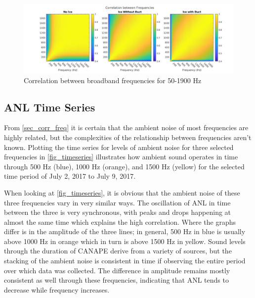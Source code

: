 
\begin{figure}[ht]
\centering
\includegraphics[scale=0.35]{Figures/corr_all_1x3.jpg}
\caption{Correlation between broadband frequencies for 50-1900 Hz}
\label{fig_freq_corr}
\end{figure}

\subsection{ANL Time Series}\label{sec_timeseries}

From \autoref{sec_corr_freq} it is certain that the ambient noise of most frequencies are highly related, but the complexities of the relationship between frequencies aren't known. Plotting the time series for levels of ambient noise for three selected frequencies in \autoref{fig_timeseries} illustrates how ambient sound operates in time through 500 Hz (blue), 1000 Hz (orange), and 1500 Hz (yellow) for the selected time period of July 2, 2017 to July 9, 2017. %

When looking at \autoref{fig_timeseries}, it is obvious that the ambient noise of these three frequencies vary in very similar ways. The oscillation of ANL in time between the three is very synchronous, with peaks and drops happening at almost the same time which explains the high correlation. Where the graphs differ is in the amplitude of the three lines; in general, 500 Hz in blue is usually above 1000 Hz in orange which in turn is above 1500 Hz in yellow. Sound levels through the duration of CANAPE derive from a variety of sources, but the stacking of the ambient noise is consistent in time if observing the entire period over which data was collected. The difference in amplitude remains mostly consistent as well through these frequencies, indicating that ANL tends to decrease while frequency increases. 

